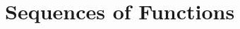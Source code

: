 \documentclass[oneside]{amsart}
\theoremstyle{definition}
\newtheorem{prop}{Proposition}[section]
\newtheorem{coro}{Corollary}[section]
\DeclareMathOperator{\Lim}{Lim}
\DeclareMathOperator{\Int}{Int}
\newcommand{\rr}{\mathbb R}
\begin{document}

\section{Sequences of Functions}
\end{document}
